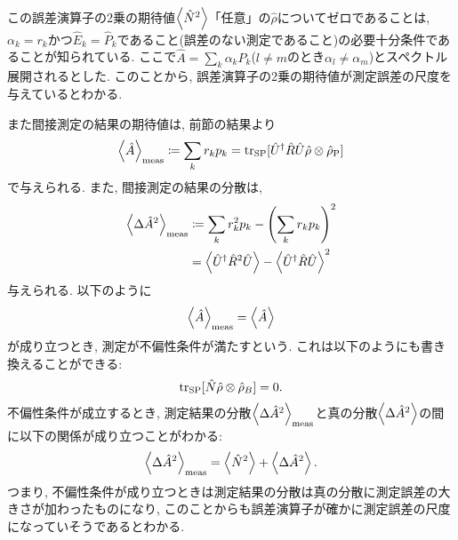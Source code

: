 この誤差演算子の2乗の期待値\(\ev{\hat{N}^2}\)「任意」の\(\hat{\rho}\)についてゼロであることは, \(\alpha_k=r_k\)かつ\(\hat{E}_k=\hat{P}_k\)であること(誤差のない測定であること)の必要十分条件であることが知られている. ここで\(\hat{A}=\sum_k\alpha_k\hat{P}_k\)(\(l\neq m\)のとき\(\alpha_l\neq\alpha_m\))とスペクトル展開されるとした. このことから, 誤差演算子の2乗の期待値が測定誤差の尺度を与えているとわかる. 

また間接測定の結果の期待値は, 前節の結果より
\begin{equation}
  \ev{\hat{A}}_{\si{meas}}\coloneqq\sum_{k}r_{k}p_k=\tr_{\si{SP}}[\hat{U}^\dag\hat{R}\hat{U}\hat{\rho}\otimes\hat{\rho}_{\si{P}}]
\end{equation}
で与えられる. また, 間接測定の結果の分散は,
\begin{equation}
  \begin{aligned}
    \ev{\Delta \hat{A}^2}_{\si{meas}}&\coloneqq\sum_{k}r_k^2p_k-\left(\sum_{k}r_kp_k\right)^2\\
    &=\ev{\hat{U}^\dag\hat{R}^2\hat{U}}-\ev{\hat{U}^\dag\hat{R}\hat{U}}^2
    \end{aligned}
\end{equation}
与えられる. 以下のように
\begin{equation}
    \ev{\hat{A}}_{\si{meas}}=\ev{\hat{A}}
\end{equation}
が成り立つとき, 測定が不偏性条件が満たすという. これは以下のようにも書き換えることができる:
\begin{equation}
    \tr_{\si{SP}}[\hat{N}\hat{\rho}\otimes\hat{\rho}_B]=0.
\end{equation}
不偏性条件が成立するとき, 測定結果の分散\(\ev{\Delta\hat{A}^2}_{\si{meas}}\)と真の分散\(\ev{\Delta\hat{A}^2}\)の間に以下の関係が成り立つことがわかる:
\begin{equation}
    \ev{\Delta\hat{A}^2}_{\si{meas}}=\ev{\hat{N}^2}+\ev{\Delta\hat{A}^2}.
\end{equation}
つまり, 不偏性条件が成り立つときは測定結果の分散は真の分散に測定誤差の大きさが加わったものになり, このことからも誤差演算子が確かに測定誤差の尺度になっていそうであるとわかる. 
